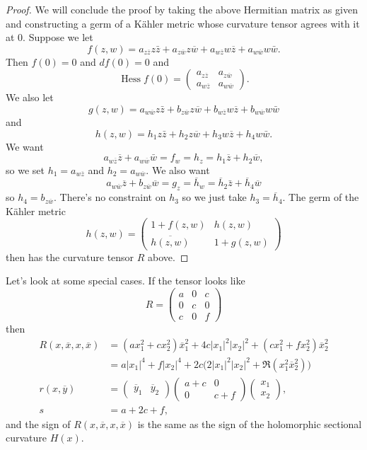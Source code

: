 \documentclass[10pt,a4paper]{amsart}
\theoremstyle{definition}
\def\ov#1{\overline{#1}}
\begin{document}
\begin{proof}
We will conclude the proof by taking the above Hermitian matrix as given and
constructing a germ of a K\"ahler metric whose curvature tensor agrees with it
at $0$.
Suppose we let
$$
f(z,w)
= a_{z \ov z} z \bar z
+ a_{z \ov w} z \ov w
+ a_{w \ov z} w \ov z
+ a_{w \ov w} w \bar w.
$$
Then $f(0) = 0$ and $df(0) = 0$ and
$$
\operatorname{Hess} f(0)
= \begin{pmatrix}
a_{z \ov z} & a_{z \ov w}
\\
a_{w \ov z} & a_{w \ov w}
\end{pmatrix}.
$$
We also let
$$
g(z,w)
= a_{w \ov w} z \bar z
+ b_{z \ov w} z \ov w
+ b_{w \ov z} w \ov z
+ b_{w \ov w} w \bar w
$$
and
$$
h(z,w)
= h_1 z \bar z
+ h_2 z \ov w
+ h_3 w \ov z
+ h_4 w \bar w.
$$
We want
$$
a_{w \ov z} \ov z + a_{w \ov w} \bar w
= f_w = h_z
= h_1 \ov z + h_2 \ov w,
$$
so we set $h_1 = a_{w \ov z}$ and $h_2 = a_{w \ov w}$.
We also want
$$
a_{w \ov w} \ov z + b_{z \ov w} \ov w
= g_z = \ov h_w
= \ov h_2 \bar z + \ov h_4 \ov w
$$
so $h_4 = b_{z \ov w}$.
There's no constraint on $h_3$ so we just take $h_3 = \ov h_4$.
The germ of the K\"ahler metric
$$
h(z,w)
= \begin{pmatrix}
1 + f(z,w) & h(z,w)
\\
\ov{h(z,w)} & 1 + g(z,w)
\end{pmatrix}
$$
then has the curvature tensor $R$ above.
\end{proof}

Let's look at some special cases. If the tensor looks like
$$
R =
\begin{pmatrix}
a & 0 & c
\\
0 & c & 0
\\
c & 0 & f
\end{pmatrix}
$$
then
\begin{align*}
R(x, \ov x, x, \ov x)
&= (a x_1^2 + c x_2^2) \ov x_1^2
+ 4 c |x_1|^2 |x_2|^2
+ (c x_1^2 + f x_2^2) \ov x_2^2
\\
&= a |x_1|^4 + f |x_2|^4
+ 2 c \bigl(2 |x_1|^2 |x_2|^2 + \Re(x_1^2 \ov x_2^2) \bigr)
\\
r(x, \ov y)
&=
\begin{pmatrix}\ov y_1 & \ov y_2 \end{pmatrix}
\begin{pmatrix}
a + c & 0 \\ 0 & c + f
\end{pmatrix}
\begin{pmatrix} x_1 \\ x_2 \end{pmatrix},
\\
s &= a + 2c + f,
\end{align*}
and the sign of $R(x, \ov x, x, \ov x)$ is the same as the sign of the
holomorphic sectional curvature $H(x)$.
\end{document}
